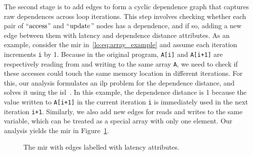 The second stage is to add edges to form a cyclic dependence graph that
captures \gls{raw} dependences across loop iterations.  This step involves
checking whether each pair of ``$\operatorname{\mathrm{access}}$'' and ``$\operatorname{\mathrm{update}}$'' nodes
has a dependence, and if so, adding a new edge between them with latency
and dependence distance attributes.  As an example, consider the \gls{mir}
in~\eqref{lo:eq:array_example} and assume each iteration increments \verb|i|
by 1.  Because in the original program, \verb|A[i]| and \verb|A[i+1]| are
respectively reading from and writing to the same array \verb|A|, we need to
check if these accesses could touch the same memory location in different
iterations.  For this, our analysis formulates an \gls{ilp} problem for
the dependence distance, and solves it using the \gls{isl}~\cite{isl}.
In this example, the dependence distance is 1 because the value written
to \verb|A[i+1]| in the current iteration \verb|i| is immediately used
in the next iteration \verb|i+1|.  Similarly, we also add new edges
for reads and writes to the same variable, which can be treated as a
special array with only one element. Our analysis yields the \gls{mir} in
Figure~\ref{lo:fig:example_latency}.

\begin{figure}[ht]
    \centering
    \caption{%
        The \gls{mir} with edges labelled with latency attributes.
    }\label{lo:fig:example_latency}
\end{figure}

